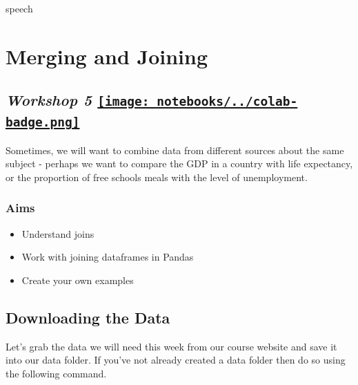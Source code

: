\documentclass[
  letterpaper,
  DIV=11,
  numbers=noendperiod]{scrreprt}
\newenvironment{Shaded}{\begin{snugshade}}{\end{snugshade}}
\newcommand{\NormalTok}[1]{\textcolor[rgb]{0.00,0.23,0.31}{#1}}
\providecommand{\tightlist}{%
  \setlength{\itemsep}{0pt}\setlength{\parskip}{0pt}}\usepackage{longtable,booktabs,array}
\begin{document}
\begin{Shaded}
\begin{Highlighting}[]
\NormalTok{speech}
\end{Highlighting}
\end{Shaded}


\hypertarget{merging-and-joining}{%
\chapter{Merging and Joining}\label{merging-and-joining}}

\hypertarget{workshop-5-open-in-colab}{%
\section[\emph{Workshop 5} ]{\texorpdfstring{\emph{Workshop 5}
\href{https://colab.research.google.com/github/oballinger/QM2/blob/main/notebooks/W05.\%20Merging\%20and\%20Joining.ipynb}{\protect\texttt{[image: notebooks/../colab-badge.png]}}}{Workshop 5 Open In Colab}}\label{workshop-5-open-in-colab}}

Sometimes, we will want to combine data from different sources about the
same subject - perhaps we want to compare the GDP in a country with life
expectancy, or the proportion of free schools meals with the level of
unemployment.

\hypertarget{aims-2}{%
\subsection{Aims}\label{aims-2}}

\begin{itemize}
\tightlist
\item
  Understand joins
\item
  Work with joining dataframes in Pandas
\item
  Create your own examples
\end{itemize}

\hypertarget{downloading-the-data-2}{%
\section{Downloading the Data}\label{downloading-the-data-2}}

Let's grab the data we will need this week from our course website and
save it into our data folder. If you've not already created a data
folder then do so using the following command.
\end{document}
